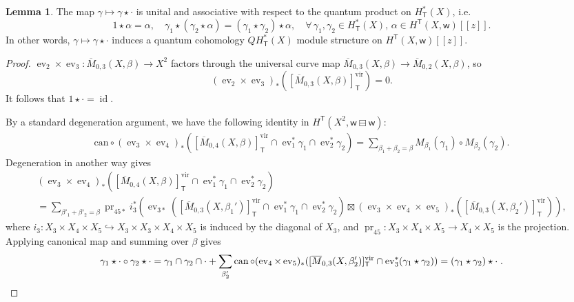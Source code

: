 \documentclass[10pt]{amsart}
\theoremstyle{definition}
\newtheorem{Lemma}[Theorem]{Lemma}
\numberwithin{equation}{section}
\newcommand{\vir}{\mathrm{vir}}
\newcommand{\sT}{\mathsf{T}}
\newcommand{\sw}{\mathsf{w}}
\newcommand{\can}{\operatorname{can}}
\newcommand{\ev}{\operatorname{ev}}
\newcommand{\pr}{\operatorname{pr}}
\newcommand{\id}{\operatorname{id}}
\begin{document}
\begin{Lemma}
The map $\gamma\mapsto \gamma\star\cdot$ is unital and associative with respect to the quantum product on $H^*_\sT(X)$, i.e. $$1\star\alpha=\alpha, \quad \gamma_1\star(\gamma_2\star\alpha)=(\gamma_1\star\gamma_2)\star\alpha, \quad \forall\,\gamma_1, \gamma_2\in H^*_\sT(X), \,\alpha\in H^{\sT}(X,\sw)[\![z]\!]. $$ 
In other words, $\gamma\mapsto \gamma\star\cdot$ induces a quantum cohomology $QH^*_\sT(X)$ module structure on $H^{\sT}(X,\sw)[\![z]\!]$.
\end{Lemma}

\begin{proof}
$\ev_{2}\times \ev_3\colon \overline{M}_{0,3}(X,\beta)\to X^2$ factors through the universal curve map $\overline{M}_{0,3}(X,\beta)\to \overline{M}_{0,2}(X,\beta)$, so $$(\ev_{2}\times \ev_3)_*([\overline{M}_{0,3}(X,\beta)]_{\sT}^{\vir})=0.$$
It follows that $1\star\cdot=\id$. 

By a standard degeneration argument, we have the following identity in $H^{\sT}(X^2,\sw\boxminus \sw)$:
\begin{align*}
    \mathrm{can}\circ (\ev_{3}\times \ev_4)_*([\overline{M}_{0,4}(X,\beta)]_{\sT}^{\vir}\cap \ev_1^*\gamma_1\cap \ev_2^*\gamma_2)=\sum_{\beta_1+\beta_2=\beta}M_{\beta_1}(\gamma_1)\circ M_{\beta_2}(\gamma_2).
\end{align*}
Degeneration in another way gives
\begin{multline*}
(\ev_{3}\times \ev_4)_*([\overline{M}_{0,4}(X,\beta)]_{\sT}^{\vir}\cap \ev_1^*\gamma_1\cap \ev_2^*\gamma_2)\\=\sum_{\beta'_1+\beta'_2=\beta}\pr_{45*} i_3^*\left(\ev_{3*}([\overline{M}_{0,3}(X,\beta_1')]_{\sT}^{\vir}\cap \ev_1^*\gamma_1\cap \ev_2^*\gamma_2)\boxtimes(\ev_{3}\times \ev_4\times \ev_5)_*([\overline{M}_{0,3}(X,\beta_2')]_{\sT}^{\vir})\right),
\end{multline*}
where $i_3\colon X_3\times X_4\times X_5\hookrightarrow X_3\times X_3\times X_4\times X_5$ is induced by the diagonal of $X_3$, and $\pr_{45}\colon X_3\times X_4\times X_5\to  X_4\times X_5$ is the projection. Applying canonical map and summing over $\beta$ gives
\begin{equation*}
\gamma_1\star\cdot\circ\gamma_2\star\cdot=\gamma_1\cap\gamma_2\cap\cdot+\sum_{\beta_2'}\can\circ(\ev_4\times \ev_5)_*([\overline{M}_{0,3}(X,\beta_2')]_{\sT}^{\vir}\cap \ev_{3}^*(\gamma_1\star\gamma_2))=(\gamma_1\star\gamma_2)\star\cdot\;.\qedhere
\end{equation*}
\end{proof}
\end{document}
